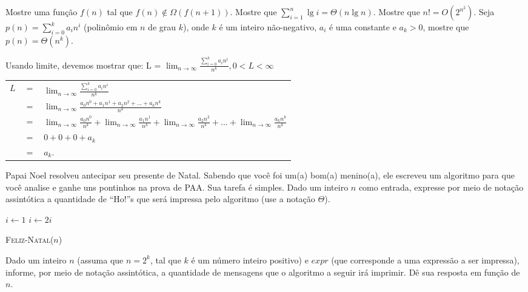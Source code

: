 \documentclass[a4paper]{exam}
\begin{document}
\begin{questions}
  \question Mostre uma função $f(n)$ tal que $f(n) \not\in \Omega(f(n+1))$.
  \question Mostre que $\sum_{i=1}^{n} \lg i = \Theta(n \lg n)$.
  \question Mostre que $n! = O(2^{n^2})$.
  \question Seja $p(n) = \sum_{i=0}^{k} a_{i}n^{i}$
  (polinômio em $n$ de grau $k$), onde $k$ é um inteiro não-negativo, $a_i$
  é uma constante e $a_k > 0$, mostre que $p(n) = \Theta(n^k)$.
  \begin{solution}
    Usando limite, devemos mostrar que: L = $\displaystyle\lim_{n\to\infty} \frac{\sum_{i=0}^{k} a_{i}n^{i}}{n^k}, 0 < L < \infty$\\
    \begin{tabular}{lll}
      $ L $&  $=$ &$ \displaystyle\lim_{n\to\infty} \frac{\sum_{i=0}^{k} a_{i}n^{i}}{n^k}$ \\
      {}& $=$ &$ \displaystyle\lim_{n\to\infty} \frac{a_0 n^0 + a_1 n^1 + a_2 n^2 + ... + a_k n^k}{n^k}$ \\
      {}& $=$ &$ \displaystyle\lim_{n\to\infty} \frac{a_0 n^0}{n^k} + 
                \displaystyle\lim_{n\to\infty} \frac{a_1 n^1}{n^k} + 
                \displaystyle\lim_{n\to\infty} \frac{a_2 n^2}{n^k} + ... + 
                \displaystyle\lim_{n\to\infty} \frac{a_k n^k}{n^k} $\\
      {}& $=$ &$ 0 + 0 + 0 + a_k $ \\
      {}& $=$ &$ a_k. $\\
    \end{tabular}
  \end{solution}
  \question Papai Noel resolveu antecipar seu presente de
  Natal. Sabendo que você foi um(a) bom(a) menino(a), ele escreveu um
  algoritmo para que você analise e ganhe uns pontinhos na prova de
  PAA. Sua tarefa é simples. Dado um inteiro $n$ como entrada,
  expresse por meio de notação assintótica a quantidade de ``Ho!''s
  que será impressa pelo algoritmo (use a notação $\Theta$).
  
  \begin{algorithm}[H]
    \NoCaptionOfAlgo
    \DontPrintSemicolon

    $i \leftarrow 1$\;
     {
      $i \leftarrow 2i$\;
    }
    \caption{\textsc{Feliz-Natal}($n$)}
  \end{algorithm}
  \question Dado um inteiro $n$ (assuma que $n=2^k$, tal que
  $k$ é um número inteiro positivo) e $expr$ (que corresponde a uma
  expressão a ser impressa), informe, por meio de notação assintótica,
  a quantidade de mensagens que o algoritmo a seguir irá
  imprimir. Dê sua resposta em função de $n$.


\end{questions}
\end{document}
